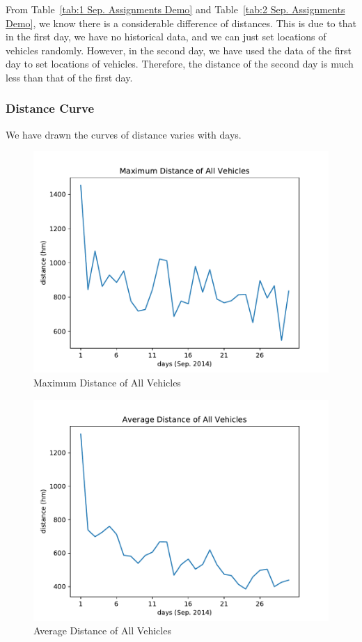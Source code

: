 \documentclass{llncs}
\begin{document}
From Table~\ref{tab:1 Sep. Assignments Demo} and Table~\ref{tab:2 Sep. Assignments Demo}, we know there is a considerable difference of distances. This is due to that in the first day, we have no historical data, and we can just set locations of vehicles randomly. However, in the second day, we have used the data of the first day to set locations of vehicles. Therefore, the distance of the second day is much less than that of the first day.

\subsubsection{Distance Curve}
We have drawn the curves of distance varies with days.

\begin{figure}[H]
    \centering
    \includegraphics[width=.6\textwidth]{figures/max_distances_curve.pdf}
    \caption{Maximum Distance of All Vehicles}
    \label{fig:Maximum Distance of All Vehicles}
\end{figure}

\begin{figure}[H]
    \centering
    \includegraphics[width=.6\textwidth]{figures/ave_distances_curve.pdf}
    \caption{Average Distance of All Vehicles}
    \label{fig:Average Distance of All Vehicles}
\end{figure}
\end{document}
